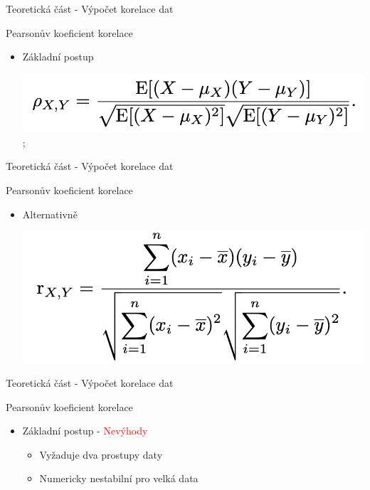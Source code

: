 \documentclass[aspectratio=169, xcolor=dvipsnames]{beamer}
\begin{document}
\begin{frame}{Teoretická část - Výpočet korelace dat}
  \begin{block}{Pearsonův koeficient korelace}
    \begin{itemize}
        \pause
       \item Základní postup
         \begin{center}
           \includegraphics[width=\linewidth]{assets/pearson-twopass.png}; 
         \end{center}
     \end{itemize} 
  \end{block} 
\end{frame}

\begin{frame}{Teoretická část - Výpočet korelace dat}
  \begin{block}{Pearsonův koeficient korelace}
    \begin{itemize}
     \item Alternativně
        \begin{center}
          \includegraphics[width=\linewidth]{assets/pearson-twopass-2.png}
        \end{center}
     \end{itemize} 
  \end{block} 
\end{frame}

\begin{frame}{Teoretická část - Výpočet korelace dat}
  \begin{block}{Pearsonův koeficient korelace}
    \begin{itemize}
      \item Základní postup - \textcolor{Red}{Nevýhody}
        \begin{itemize}
          \item Vyžaduje dva prostupy daty
          \item Numericky nestabilní pro velká data 
        \end{itemize}
     \end{itemize} 
  \end{block} 
\end{frame}
\end{document}

